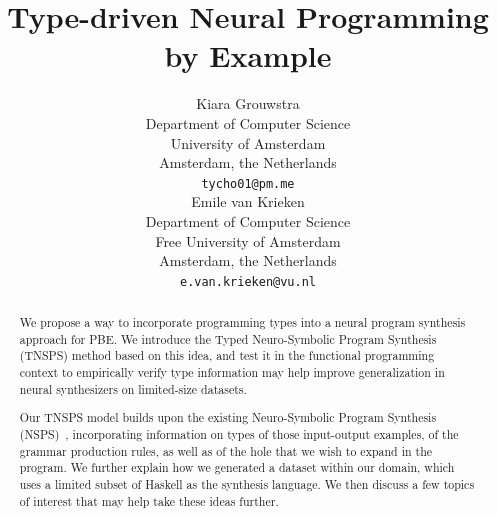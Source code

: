 \documentclass{article} %
\title{Type-driven Neural Programming by Example}
\author{
   Kiara Grouwstra
   \\
   Department of Computer Science \\
   University of Amsterdam\\
   Amsterdam, the Netherlands \\
   \texttt{tycho01@pm.me} \\
   \And
   Emile van Krieken \\
   Department of Computer Science \\
   Free University of Amsterdam\\
   Amsterdam, the Netherlands \\
   \texttt{e.van.krieken@vu.nl} \\
}
\begin{document}
% 


\maketitle






\begin{abstract}


   We propose a way to incorporate programming types into a neural program synthesis approach for PBE.
   We introduce the Typed Neuro-Symbolic Program Synthesis (TNSPS) method based on this idea,
   and test it in the functional programming context to empirically verify type information
   may help improve generalization in neural synthesizers on limited-size datasets.

   Our TNSPS model builds upon the existing Neuro-Symbolic Program Synthesis (NSPS)~\citep{nsps},
   incorporating information on types of those input-output examples,
   of the grammar production rules, as well as of the hole that we wish to expand in the program.
   We further explain how we generated a dataset within our domain,
   which uses a limited subset of Haskell as the synthesis language.
   We then discuss a few topics of interest that may help take these ideas further.

\end{abstract}
\end{document}
